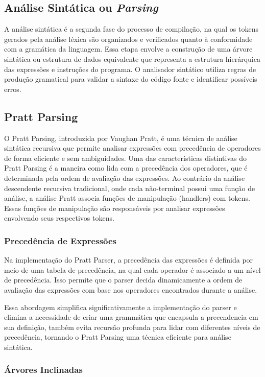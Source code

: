 \documentclass[english, 
               brazil, 
               bsc] %
               {dcomp-abntex2}
\begin{document}
\subsection{Análise Sintática ou \textit{Parsing}}
A análise sintática é a segunda fase do processo de compilação, na qual os tokens gerados pela análise léxica são organizados e verificados quanto à conformidade com a gramática da linguagem. Essa etapa envolve a construção de uma árvore sintática ou estrutura de dados equivalente que representa a estrutura hierárquica das expressões e instruções do programa. O analisador sintático utiliza regras de produção gramatical para validar a sintaxe do código fonte e identificar possíveis erros.

\subsection{Pratt Parsing}
O Pratt Parsing, introduzida por Vaughan Pratt, é uma técnica de análise sintática recursiva que permite analisar expressões com precedência de operadores de forma eficiente e sem ambiguidades. Uma das características distintivas do Pratt Parsing é a maneira como lida com a precedência dos operadores, que é determinada pela ordem de avaliação das expressões. Ao contrário da análise descendente recursiva tradicional, onde cada não-terminal possui uma função de análise, a análise Pratt associa funções de manipulação (handlers) com tokens. Essas funções de manipulação são responsáveis por analisar expressões envolvendo seus respectivos tokens.

\subsubsection{Precedência de Expressões}

Na implementação do Pratt Parser, a precedência das expressões é definida por meio de uma tabela de precedência, na qual cada operador é associado a um nível de precedência. Isso permite que o parser decida dinamicamente a ordem de avaliação das expressões com base nos operadores encontrados durante a análise.

Essa abordagem simplifica significativamente a implementação do parser e elimina a necessidade de criar uma grammática que encapsula a precendencia em sua definição, também evita recursão profunda para lidar com diferentes níveis de precedência, tornando o Pratt Parsing uma técnica eficiente para análise sintática.

\subsubsection{Árvores Inclinadas}
\end{document}
